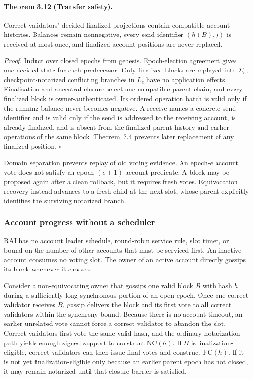 \documentclass[10pt,twocolumn]{article}
\newcommand{\NC}{\mathrm{NC}}
\newcommand{\FC}{\mathrm{FC}}
\begin{document}
\paragraph{Theorem 3.12 (Transfer safety).} Correct validators' decided finalized projections contain compatible account histories. Balances remain nonnegative, every send identifier $(h(B),j)$ is received at most once, and finalized account positions are never replaced.

\emph{Proof.} Induct over closed epochs from genesis. Epoch-election agreement gives one decided state for each predecessor. Only finalized blocks are replayed into $\Sigma_e$; checkpoint-notarized conflicting branches in $L_e$ have no application effects. Finalization and ancestral closure select one compatible parent chain, and every finalized block is owner-authenticated. Its ordered operation batch is valid only if the running balance never becomes negative. A receive names a concrete send identifier and is valid only if the send is addressed to the receiving account, is already finalized, and is absent from the finalized parent history and earlier operations of the same block. Theorem~3.4 prevents later replacement of any finalized position. $\square$

Domain separation prevents replay of old voting evidence. An epoch-$e$ account vote does not satisfy an epoch-$(e+1)$ account predicate. A block may be proposed again after a clean rollback, but it requires fresh votes. Equivocation recovery instead advances to a fresh child at the next slot, whose parent explicitly identifies the surviving notarized branch.

\subsubsection{Account progress without a scheduler}
RAI has no account leader schedule, round-robin service rule, slot timer, or bound on the number of other accounts that must be serviced first. An inactive account consumes no voting slot. The owner of an active account directly gossips its block whenever it chooses.

Consider a non-equivocating owner that gossips one valid block $B$ with hash $h$ during a sufficiently long synchronous portion of an open epoch. Once one correct validator receives $B$, gossip delivers the block and its first vote to all correct validators within the synchrony bound. Because there is no account timeout, an earlier unrelated vote cannot force a correct validator to abandon the slot. Correct validators first-vote the same valid hash, and the ordinary notarization path yields enough signed support to construct $\NC(h)$. If $B$ is finalization-eligible, correct validators can then issue final votes and construct $\FC(h)$. If it is not yet finalization-eligible only because an earlier parent epoch has not closed, it may remain notarized until that closure barrier is satisfied.
\end{document}
